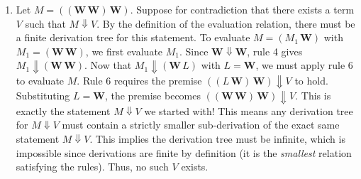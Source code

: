 \documentclass{article}
\begin{document}
\begin{enumerate}[label=\fbox{\arabic*}]
\begin{enumerate}[label=(\arabic*)]
          \item Let $M = ((\mathbf{W} \, \mathbf{W}) \, \mathbf{W})$. 
          Suppose for contradiction that there exists a term $V$ such that $M \Downarrow V$. 
          By the definition of the evaluation relation, there must be a finite derivation tree for this statement.
          To evaluate $M = (M_1 \, \mathbf{W})$ with $M_1 = (\mathbf{W} \, \mathbf{W})$, we first evaluate $M_1$. 
          Since $\mathbf{W} \Downarrow \mathbf{W}$, rule 4 gives $M_1 \Downarrow (\mathbf{W} \, \mathbf{W})$.
          Now that $M_1 \Downarrow (\mathbf{W} \, L)$ with $L = \mathbf{W}$, we must apply rule 6 to evaluate $M$. 
          Rule 6 requires the premise $((L \, \mathbf{W}) \, \mathbf{W}) \Downarrow V$ to hold.
          Substituting $L = \mathbf{W}$, the premise becomes $((\mathbf{W} \, \mathbf{W}) \, \mathbf{W}) \Downarrow V$.
          This is exactly the statement $M \Downarrow V$ we started with! 
          This means any derivation tree for $M \Downarrow V$ must contain a strictly smaller sub-derivation of the exact same statement $M \Downarrow V$. This implies the derivation tree must be infinite, which is impossible since derivations are finite by definition (it is the \emph{smallest} relation satisfying the rules). 
          Thus, no such $V$ exists.
          

\end{enumerate}
\end{enumerate}
\end{document}
